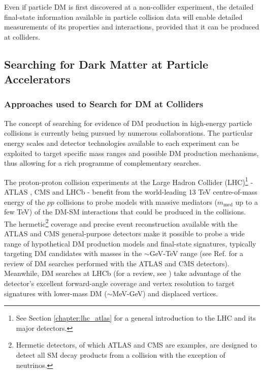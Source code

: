Even if particle DM is first discovered at a non-collider experiment, the detailed final-state information available in particle collision data will enable detailed measurements of its properties and interactions, provided that it can be produced at colliders.

\subsection{Searching for Dark Matter at Particle Accelerators}

\subsubsection{Approaches used to Search for DM at Colliders}

The concept of searching for evidence of DM production in high-energy particle collisions is currently being pursued by numerous collaborations. The particular energy scales and detector technologies available to each experiment can be exploited to target specific mass ranges and possible DM production mechanisms, thus allowing for a rich programme of complementary searches.

The proton-proton collision experiments at the Large Hadron Collider (LHC)\footnote{See Section \ref{chapter:lhc_atlas} for a general introduction to the LHC and its major detectors.} \cite{lhc_machine} - ATLAS \cite{atlas}, CMS \cite{cms} and LHCb \cite{LHCb} - benefit from the world-leading 13 TeV centre-of-mass energy of the \(pp\) collisions to probe models with massive mediators (\(m_\text{med}\) up to a few TeV) of the DM-SM interactions that could be produced in the collisions. The hermetic\footnote{Hermetic detectors, of which ATLAS and CMS are examples, are designed to detect all SM decay products from a collision with the exception of neutrinos.} coverage and precise event reconstruction available with the ATLAS and CMS general-purpose detectors make it possible to probe a wide range of hypothetical DM production models and final-state signatures, typically targeting DM candidates with masses in the \(\sim\)GeV-TeV range (see Ref. \cite{Trevisani:2018psx} for a review of DM searches performed with the ATLAS and CMS detectors). Meanwhile, DM searches at LHCb (for a review, see \cite{mombacher2021dark}) take advantage of the detector's excellent forward-angle coverage and vertex resolution to target signatures with lower-mass DM (\(\sim\)MeV-GeV) and displaced vertices.

